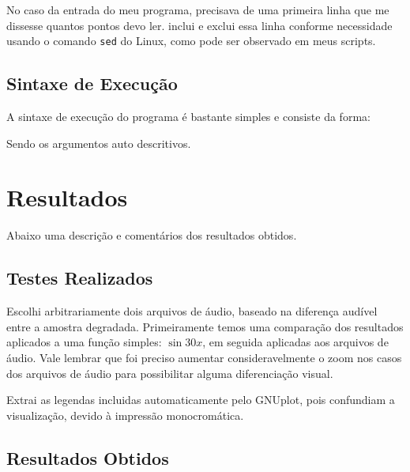 No caso da entrada do meu programa, precisava de uma primeira linha que me dissesse quantos pontos devo ler. inclui e exclui essa linha conforme necessidade usando o comando \texttt{sed} do Linux, como pode ser observado em meus scripts.

\subsection{Sintaxe de Execução}

A sintaxe de execução do programa é bastante simples e consiste da forma:

\begin{center}
\end{center}

Sendo os argumentos auto descritivos.

\section{Resultados}

Abaixo uma descrição e comentários dos resultados obtidos.

\subsection{Testes Realizados}

Escolhi arbitrariamente dois arquivos de áudio, baseado na diferença audível entre a amostra degradada. Primeiramente temos uma comparação dos resultados aplicados a uma função simples: $\sin{30x}$, em seguida aplicadas aos arquivos de áudio. Vale lembrar que foi preciso aumentar consideravelmente o zoom nos casos dos arquivos de áudio para possibilitar alguma diferenciação visual.

Extrai as legendas incluidas automaticamente pelo GNUplot, pois confundiam a visualização, devido à impressão monocromática.

\clearpage
\subsection{Resultados Obtidos}

